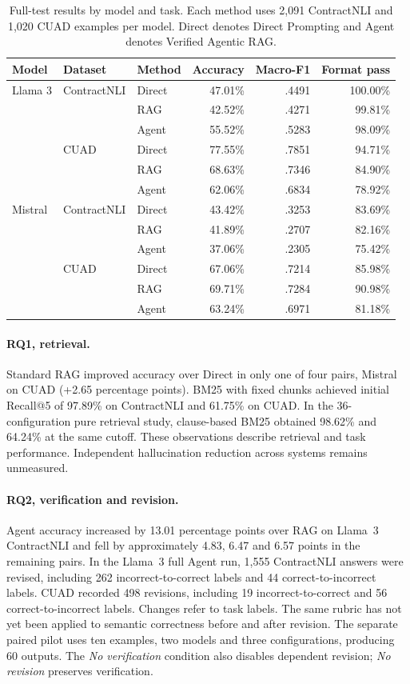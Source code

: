 \documentclass{article}
\begin{document}
\begin{table}[!htbp]
\centering\small
\begin{tabular}{lllrrr}
\toprule
Model & Dataset & Method & Accuracy & Macro-F1 & Format pass \\
\midrule
Llama 3 & ContractNLI & Direct & 47.01\% & .4491 & 100.00\% \\
 & & RAG & 42.52\% & .4271 & 99.81\% \\
 & & Agent & 55.52\% & .5283 & 98.09\% \\
 & CUAD & Direct & 77.55\% & .7851 & 94.71\% \\
 & & RAG & 68.63\% & .7346 & 84.90\% \\
 & & Agent & 62.06\% & .6834 & 78.92\% \\
\midrule
Mistral & ContractNLI & Direct & 43.42\% & .3253 & 83.69\% \\
 & & RAG & 41.89\% & .2707 & 82.16\% \\
 & & Agent & 37.06\% & .2305 & 75.42\% \\
 & CUAD & Direct & 67.06\% & .7214 & 85.98\% \\
 & & RAG & 69.71\% & .7284 & 90.98\% \\
 & & Agent & 63.24\% & .6971 & 81.18\% \\
\bottomrule
\end{tabular}
\caption{Full-test results by model and task. Each method uses 2,091 ContractNLI and 1,020 CUAD examples per model. Direct denotes Direct Prompting and Agent denotes Verified Agentic RAG.}
\label{tab:main}
\end{table}

\paragraph{RQ1, retrieval.} Standard RAG improved accuracy over Direct in only one of four pairs, Mistral on CUAD (+2.65 percentage points). BM25 with fixed chunks achieved initial Recall@5 of 97.89\% on ContractNLI and 61.75\% on CUAD. In the 36-configuration pure retrieval study, clause-based BM25 obtained 98.62\% and 64.24\% at the same cutoff. These observations describe retrieval and task performance. Independent hallucination reduction across systems remains unmeasured.

\paragraph{RQ2, verification and revision.} Agent accuracy increased by 13.01 percentage points over RAG on Llama~3 ContractNLI and fell by approximately 4.83, 6.47 and 6.57 points in the remaining pairs. In the Llama~3 full Agent run, 1,555 ContractNLI answers were revised, including 262 incorrect-to-correct labels and 44 correct-to-incorrect labels. CUAD recorded 498 revisions, including 19 incorrect-to-correct and 56 correct-to-incorrect labels. Changes refer to task labels. The same rubric has not yet been applied to semantic correctness before and after revision. The separate paired pilot uses ten examples, two models and three configurations, producing 60 outputs. The \emph{No verification} condition also disables dependent revision; \emph{No revision} preserves verification.
\end{document}

